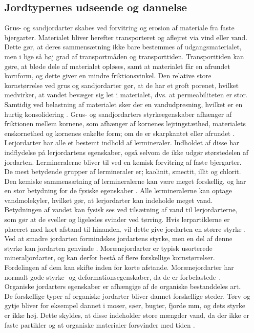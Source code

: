 \subsection{Jordtypernes udseende og dannelse}
Grus- og sandjordarter skabes ved forvitring og erosion af materiale fra faste bjergarter. Materialet bliver herefter transporteret og aflejret via vind eller vand. Dette gør, at deres sammensætning ikke bare bestemmes af udgangsmaterialet, men i lige så høj grad af transportmåden og transporttiden. Transporttiden kan gøre, at bløde dele af materialet opløses, samt at materialet får en afrundet kornform, og dette giver en mindre friktionsvinkel. Den relative store kornstørrelse ved grus og sandjordarter gør, at de har et groft porenet, hvilket medvirker, at vandet bevæger sig let i materialet,  dvs. at permeabiliteten er stor. Samtidig ved belastning af materialet sker der en vandudpresning, hvilket er en hurtig konsolidering \citep{jordarter}.
\newline \indent{     }  Grus- og sandjordarters styrkeegenskaber afhænger af friktionen mellem kornene, som afhænger af kornenes lejringstæthed, materialets enskornethed og kornenes enkelte form; om de er skarpkantet eller afrundet \citep{jordarter}.
\newline \indent{     }  Lerjordarter har alle et bestemt indhold af lermineraler. Indholdet af disse har indflydelse på lerjordartens egenskaber, også selvom de ikke udgør størstedelen af jordarten. Lermineralerne bliver til ved en kemisk forvitring af faste bjergarter. De mest betydende grupper af lermineraler er; kaolinit, smectit, illit og chlorit. Den kemiske sammensætning af lermineralerne kan være meget forskellig, og har en stor betydning for de fysiske egenskaber \citep{jordarter}. Alle lermineralerne kan optage vandmolekyler, hvilket gør, at lerjordarter kan indeholde meget vand. Betydningen af vandet kan fysisk ses ved tilsætning af vand til lerjordarterne, som gør at de sveller og ligeledes svinder ved tørring. Hvis lerpartiklerne er placeret med kort afstand til hinanden, vil dette give jordarten en større styrke \citep{jordarter}. Ved at smadre jordarten formindskes jordartens styrke, men en del af denne styrke kan jordarten genvinde \citep{jordarter}.
\newline \indent{     }  Morænejordarter er typisk usorterede mineraljordarter, og kan derfor bestå af flere forskellige kornstørrelser. Fordelingen af dem kan skifte inden for korte afstande. Morænejordarter har normalt gode styrke- og deformationsegenskaber, da de er forbelastede \citep{jordarter}.
\newline \indent{     }  Organiske jordarters egenskaber er afhængige af de organiske bestanddeles art. De forskellige typer af organiske jordarter bliver dannet forskellige steder. Tørv og gytje bliver for eksempel dannet i moser, søer, bugter, fjorde mm, og dets styrke er ikke høj. Dette skyldes, at disse indeholder store mængder vand, da der ikke er faste partikler og at organiske materialer forsvinder med tiden \citep{jordarter}.

